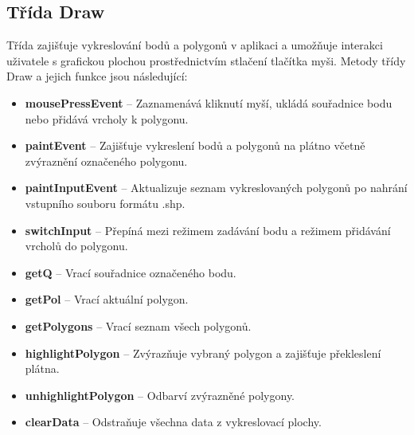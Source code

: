 \documentclass[a4paper,12pt]{article}
\begin{document}
\subsection{Třída Draw}
Třída zajišťuje vykreslování bodů a polygonů v aplikaci a umožňuje interakci uživatele s grafickou plochou prostřednictvím stlačení tlačítka myši.
Metody třídy Draw a jejich funkce jsou následující:
\begin{itemize}
    \item \textbf{mousePressEvent} – Zaznamenává kliknutí myší, ukládá souřadnice bodu nebo přidává vrcholy k polygonu.
    \item \textbf{paintEvent} – Zajišťuje vykreslení bodů a polygonů na plátno včetně zvýraznění označeného polygonu.
    \item \textbf{paintInputEvent} – Aktualizuje seznam vykreslovaných polygonů po nahrání vstupního souboru formátu .shp.
    \item \textbf{switchInput} – Přepíná mezi režimem zadávání bodu a režimem přidávání vrcholů do polygonu.
    \item \textbf{getQ} – Vrací souřadnice označeného bodu.
    \item \textbf{getPol} – Vrací aktuální polygon.
    \item \textbf{getPolygons} – Vrací seznam všech polygonů.
    \item \textbf{highlightPolygon} – Zvýrazňuje vybraný polygon a zajišťuje překleslení plátna.
    \item \textbf{unhighlightPolygon} – Odbarví zvýrazněné polygony.
    \item \textbf{clearData} – Odstraňuje všechna data z vykreslovací plochy.
\end{itemize}
\end{document}
